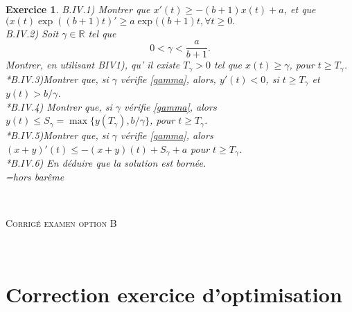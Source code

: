 \documentclass[11pt]{article}
\newcommand{\R}{\ensuremath{\mathbb R}}
\theoremstyle{exostyle}
\newtheorem{exercice}{Exercice}
\begin{document}
\begin{exercice}
  \medskip
  \noindent
  B.IV.1) Montrer que $x'(t)\geq -(b+1)x(t)+a$, et que $(x(t)\exp((b+1)t)' \geq  a\exp ((b+1)t, \forall t\geq0.$ \\
  B.IV.2) Soit  $\gamma\in \R$ tel que  
  \begin{equation}
    \label{gamma}
    0<\gamma<\frac{a}{b+1}.
  \end{equation}
  Montrer, en utilisant BIV1),  qu' il existe $T_\gamma>0$ tel que   $x(t)\geq \gamma$, pour $t\geq T_\gamma$.\\
  *B.IV.3)Montrer que, si $\gamma$ v\'erifie \eqref{gamma}, alors, $y'(t)<0$, si  $t\geq T_\gamma$ et 
  $y(t)> b\slash \gamma$.\\
  *B.IV.4) Montrer que,  si $\gamma$ v\'erifie \eqref{gamma}, alors $y(t) \leq S_\gamma=\max\{y( T_\gamma), b\slash \gamma\}$,   pour  $t\geq T_\gamma$. \\
  *B.IV.5)Montrer que,  si $\gamma$ v\'erifie \eqref{gamma}, alors $(x+y)'(t)\leq -(x+y)(t)+S_\gamma+ a$ pour $t\geq T_\gamma$. \\
  *B.IV.6) En d\'eduire que la solution est bornée. \\
  {\it *=hors bar\^eme}



\end{exercice}

\newpage

\noindent {\rule{\textwidth}{.2mm}}\\[-5mm]
\begin{center}
{\large \textsc{Corrigé examen option B} }\\[-5mm]
\end{center}
\noindent {\rule{\textwidth}{.2mm}}\\[1cm]

\section*{Correction exercice d’optimisation}
\end{document}
